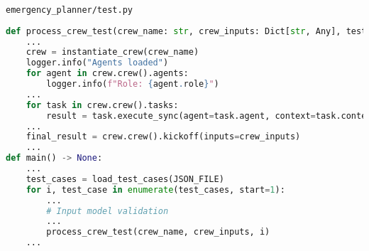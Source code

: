 \begin{frame}[fragile]{\texttt{emergency\_planner/test.py}}
    \vspace{-0.3cm}
    \begin{lstlisting}[language=Python]
def process_crew_test(crew_name: str, crew_inputs: Dict[str, Any], test_index: int) -> None:
    ...
    crew = instantiate_crew(crew_name)
    logger.info("Agents loaded")
    for agent in crew.crew().agents:
        logger.info(f"Role: {agent.role}")
    ...
    for task in crew.crew().tasks:
        result = task.execute_sync(agent=task.agent, context=task.context, tools=task.tools)
    ...
    final_result = crew.crew().kickoff(inputs=crew_inputs)
    ...
def main() -> None:
    ...
    test_cases = load_test_cases(JSON_FILE)
    for i, test_case in enumerate(test_cases, start=1):
        ...
        # Input model validation
        ...
        process_crew_test(crew_name, crew_inputs, i)
    ...
    \end{lstlisting}
\end{frame}